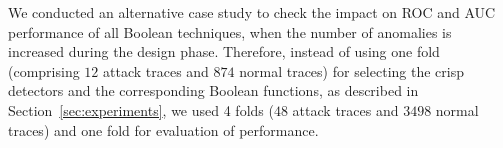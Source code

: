 \begin{table}[b]
    \centering
    \renewcommand{\arraystretch}{1.3}
    \caption{Average AUC values and their standard deviations over the 5FCV for each techniques. Design on four folds and evaluated on one fold.  }
    \label{tab:auc4}
    \centering
\end{table}

We conducted an alternative case study to check the impact on ROC and AUC performance of all Boolean techniques, when the number of anomalies is increased during the design phase.
Therefore, instead of using one fold (comprising $12$ attack traces and $874$ normal traces) for selecting the crisp detectors and the corresponding Boolean functions, as described in Section~\ref{sec:experiments}, we used 4 folds ($48$ attack traces and $3498$ normal traces) and one fold for evaluation of performance.

